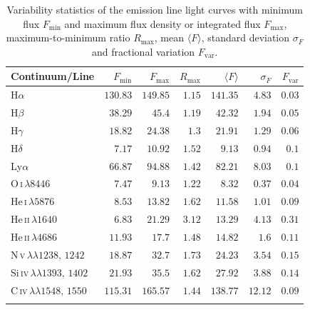 \begin{table}[htp] 
	\centering 
	\caption[Emission line variability statistics]{Variability statistics of the  emission line light curves with minimum flux $F_{\text{min}}$ and maximum flux density or integrated flux $F_{\text{max}}$, maximum-to-minimum ratio $R_{\text{max}}$, mean $\langle F \rangle$, standard deviation $\sigma_F$ and fractional variation $F_{\text{var}}$.} 
	\begin{tabular}{lrrrrrr} 
		\hline 
		\hline 
		\textbf{Continuum/Line} &  {$F_{\text{min}}$} &  {$F_{\text{max}}$} &  {$R_{\text{max}}$} &  {$\langle F \rangle$} &  {$\sigma_F$} &  {$F_{\text{var}}$} \\ 
		\hline
		\hline
		H$\alpha$  & $130.83$ & $149.85$ & $1.15$ & $141.35$ & $4.83$ & $0.03$ \\
		H$\beta$  & $38.29$ & $45.4$ & $1.19$ & $42.32$ & $1.94$ & $0.05$ \\
		H$\gamma$  & $18.82$ & $24.38$ & $1.3$ & $21.91$ & $1.29$ & $0.06$ \\
		H$\delta$  & $7.17$ & $10.92$ & $1.52$ & $9.13$ & $0.94$ & $0.1$ \\
		Ly$\alpha$  & $66.87$ & $94.88$ & $1.42$ & $82.21$ & $8.03$ & $0.1$ \\
		\hline
		O\,\textsc{i}$\,\lambda 8446$ & $7.47$ & $9.13$ & $1.22$ & $8.32$ & $0.37$ & $0.04$ \\
		\hline
		He\,\textsc{i}$\,\lambda5876$   & $8.53$ & $13.82$ & $1.62$ & $11.58$ & $1.01$ & $0.09$ \\
		He\,\textsc{ii}$\,\lambda1640$  & $6.83$ & $21.29$ & $3.12$ & $13.29$ & $4.13$ & $0.31$ \\ 
		He\,\textsc{ii}$\,\lambda4686$  & $11.93$ & $17.7$ & $1.48$ & $14.82$ & $1.6$ & $0.11$ \\
		\hline
		N\,\textsc{v}$\,\lambda\lambda 1238,\,1242$ & $18.87$ & $32.7$ & $1.73$ & $24.23$ & $3.54$ & $0.15$ \\
		Si\,\textsc{iv}$\,\lambda\lambda 1393,\,1402$  & $21.93$ & $35.5$ & $1.62$ & $27.92$ & $3.88$ & $0.14$ \\
		C\,\textsc{iv}$\,\lambda\lambda 1548,\,1550$ & $115.31$ & $165.57$ & $1.44$ & $138.77$ & $12.12$ & $0.09$ \\
		
		
		\hline 
		\hline 
		\label{tab:varstatistics_lines} 
	\end{tabular} 
\end{table}


